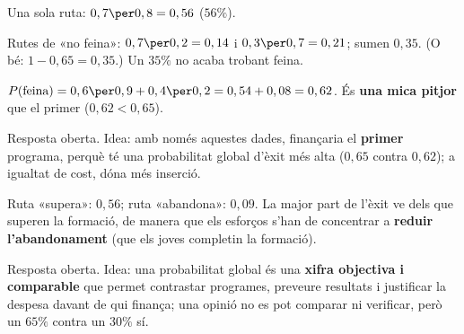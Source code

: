 \begin{solucions}
\begin{sollist}
  \item Una sola ruta: $0,7\per 0,8=0,56$ ($56\%$).
  \item Rutes de «no feina»: $0,7\per 0,2=0,14$ i $0,3\per 0,7=0,21$; sumen $0,35$. (O
        bé: $1-0,65=0,35$.) Un $35\%$ no acaba trobant feina.
  \item $P(\text{feina})=0,6\per 0,9+0,4\per 0,2=0,54+0,08=0,62$. És \textbf{una mica
        pitjor} que el primer ($0,62<0,65$).
  \item Resposta oberta. Idea: amb només aquestes dades, finançaria el \textbf{primer}
        programa, perquè té una probabilitat global d'èxit més alta ($0,65$ contra
        $0,62$); a igualtat de cost, dóna més inserció.
  \item Ruta «supera»: $0,56$; ruta «abandona»: $0,09$. La major part de l'èxit ve dels
        que superen la formació, de manera que els esforços s'han de concentrar a
        \textbf{reduir l'abandonament} (que els joves completin la formació).
  \item Resposta oberta. Idea: una probabilitat global és una \textbf{xifra objectiva i
        comparable} que permet contrastar programes, preveure resultats i justificar la
        despesa davant de qui finança; una opinió no es pot comparar ni verificar, però
        un $65\%$ contra un $30\%$ sí.
\end{sollist}
\end{solucions}
